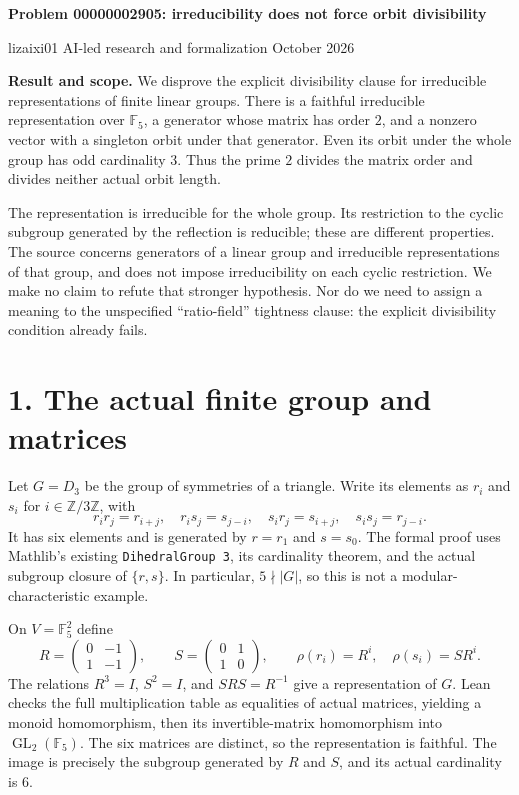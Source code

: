 \documentclass[10pt]{article}
\newcommand{\F}{\mathbb F_5}
\begin{document}
\begin{center}
{\Large\bfseries Problem 00000002905: irreducibility does not force orbit divisibility}

lizaixi01 \quad AI-led research and formalization  October 2026
\end{center}
\textbf{Result and scope.} We disprove the explicit divisibility clause for irreducible representations of finite linear groups. There is a faithful irreducible representation over $\F$, a generator whose matrix has order $2$, and a nonzero vector with a singleton orbit under that generator. Even its orbit under the whole group has odd cardinality $3$. Thus the prime $2$ divides the matrix order and divides neither actual orbit length.

The representation is irreducible for the whole group. Its restriction to the cyclic subgroup generated by the reflection is reducible; these are different properties. The source concerns generators of a linear group and irreducible representations of that group, and does not impose irreducibility on each cyclic restriction. We make no claim to refute that stronger hypothesis. Nor do we need to assign a meaning to the unspecified ``ratio-field'' tightness clause: the explicit divisibility condition already fails.

\section*{1. The actual finite group and matrices}
Let $G=D_3$ be the group of symmetries of a triangle. Write its elements as $r_i$ and $s_i$ for $i\in\mathbb Z/3\mathbb Z$, with
\[
r_i r_j=r_{i+j},\quad r_i s_j=s_{j-i},\quad
s_i r_j=s_{i+j},\quad s_i s_j=r_{j-i}.
\]
It has six elements and is generated by $r=r_1$ and $s=s_0$. The formal proof uses Mathlib's existing \texttt{DihedralGroup 3}, its cardinality theorem, and the actual subgroup closure of $\{r,s\}$. In particular, $5\nmid|G|$, so this is not a modular-characteristic example.

On $V=\F^2$ define
\[
R=\begin{pmatrix}0&-1\\1&-1\end{pmatrix},\qquad
S=\begin{pmatrix}0&1\\1&0\end{pmatrix},\qquad
\rho(r_i)=R^i,\quad \rho(s_i)=SR^i.
\]
The relations $R^3=I$, $S^2=I$, and $SRS=R^{-1}$ give a representation of $G$. Lean checks the full multiplication table as equalities of actual matrices, yielding a monoid homomorphism, then its invertible-matrix homomorphism into $\operatorname{GL}_2(\F)$. The six matrices are distinct, so the representation is faithful. The image is precisely the subgroup generated by $R$ and $S$, and its actual cardinality is $6$.
\end{document}

